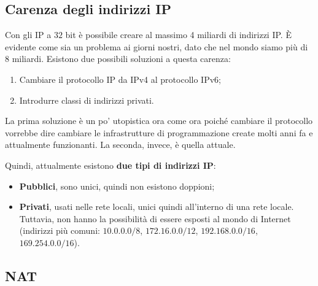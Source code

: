 \documentclass[a4paper]{article}
\begin{document}
	\subsection{Carenza degli indirizzi IP}
	
	Con gli IP a $32$ bit è possibile creare al massimo 4 miliardi di indirizzi IP. È evidente come sia un problema ai giorni nostri, dato che nel mondo siamo più di 8 miliardi. Esistono due possibili soluzioni a questa carenza:
	\begin{enumerate}
		\item Cambiare il protocollo IP da IPv4 al protocollo IPv6;
		\item Introdurre classi di indirizzi privati.
	\end{enumerate}
	La prima soluzione è un po' utopistica ora come ora poiché cambiare il protocollo vorrebbe dire cambiare le infrastrutture di programmazione create molti anni fa e attualmente funzionanti. La seconda, invece, è quella attuale.\newline
	
	\noindent
	Quindi, attualmente esistono \textbf{due tipi di indirizzi IP}:
	\begin{itemize}
		\item \textcolor{Red3}{\textbf{Pubblici}}, sono unici, quindi non esistono doppioni;
		\item \textcolor{Red3}{\textbf{Privati}}, usati nelle rete locali, unici quindi all'interno di una rete locale. Tuttavia, non hanno la possibilità di essere esposti al mondo di Internet (indirizzi più comuni: $10.0.0.0/8$, $172.16.0.0/12$, $192.168.0.0/16$, $169.254.0.0/16$).
	\end{itemize}
	
	\subsection{NAT}
	
\end{document}
